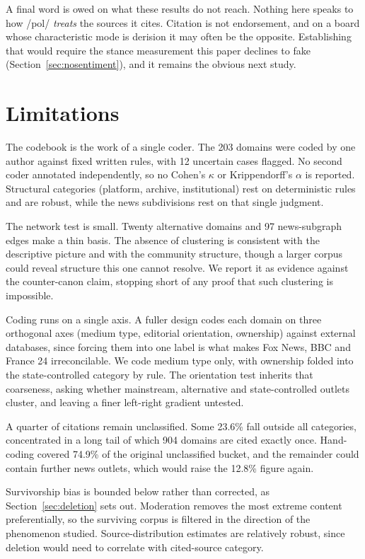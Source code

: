 \documentclass[11pt]{article}
\begin{document}
A final word is owed on what these results do not reach. Nothing here speaks to
how /pol/ \emph{treats} the sources it cites. Citation is not endorsement, and on
a board whose characteristic mode is derision it may often be the opposite.
Establishing that would require the stance measurement this paper declines to
fake (Section~\ref{sec:nosentiment}), and it remains the obvious next study.

\section{Limitations}
\label{sec:limits}

The codebook is the work of a single coder. The 203 domains were coded by one
author against fixed written rules, with 12 uncertain cases flagged. No second
coder annotated independently, so no Cohen's $\kappa$ or Krippendorff's $\alpha$
is reported. Structural categories (platform, archive, institutional) rest on
deterministic rules and are robust, while the news subdivisions rest on that
single judgment.

The network test is small. Twenty alternative domains and 97 news-subgraph edges
make a thin basis. The absence of clustering is consistent with the descriptive
picture and with the community structure, though a larger corpus could reveal
structure this one cannot resolve. We report it as evidence against the
counter-canon claim, stopping short of any proof that such clustering is
impossible.

Coding runs on a single axis. A fuller design codes each domain on three
orthogonal axes (medium type, editorial orientation, ownership) against external
databases, since forcing them into one label is what makes Fox News, BBC and
France 24 irreconcilable. We code medium type only, with ownership folded into
the state-controlled category by rule. The orientation test inherits that
coarseness, asking whether mainstream, alternative and state-controlled outlets
cluster, and leaving a finer left-right gradient untested.

A quarter of citations remain unclassified. Some 23.6\% fall outside all
categories, concentrated in a long tail of which 904 domains are cited exactly
once. Hand-coding covered 74.9\% of the original unclassified bucket, and the
remainder could contain further news outlets, which would raise the 12.8\%
figure again.

Survivorship bias is bounded below rather than corrected, as
Section~\ref{sec:deletion} sets out. Moderation removes the most extreme content
preferentially, so the surviving corpus is filtered in the direction of the
phenomenon studied. Source-distribution estimates are relatively robust, since
deletion would need to correlate with cited-source category.
\end{document}
